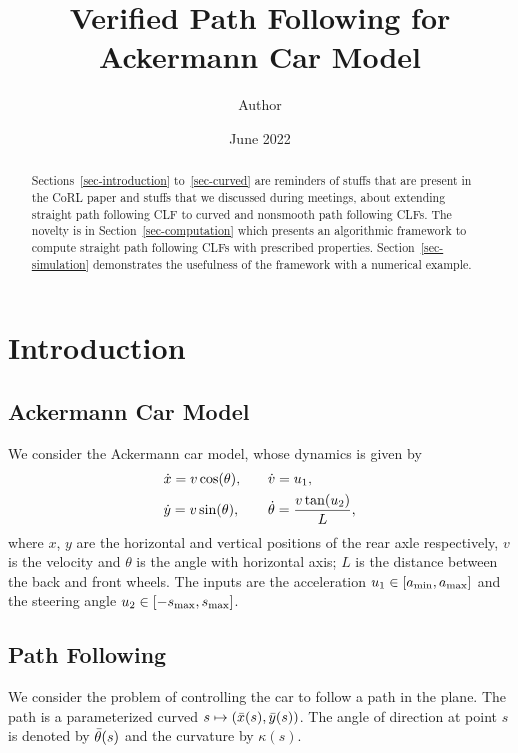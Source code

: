 \documentclass{article}
\title{Verified Path Following for Ackermann Car Model}
\author{Author}
\date{June 2022}
\theoremstyle{plain}
\theoremstyle{definition}
\theoremstyle{remark}
\newcommand{\smax}{s_\maxtxt}
\begin{document}
\maketitle

\begin{abstract}
Sections~\ref{sec-introduction} to~\ref{sec-curved} are reminders of stuffs
that are present in the CoRL paper and stuffs that we discussed during meetings,
about extending straight path following CLF to curved and nonsmooth path following CLFs.
The novelty is in Section~\ref{sec-computation} which presents an algorithmic framework to compute
straight path following CLFs with prescribed properties.
Section~\ref{sec-simulation} demonstrates the usefulness of the framework with a numerical example.
\end{abstract}

\section{Introduction}\label{sec-introduction}

\subsection{Ackermann Car Model}

We consider the Ackermann car model, whose dynamics is given by
\begin{equation}\label{eq-ackermann}
\begin{array}{>{\displaystyle}l@{\qquad}>{\displaystyle}l}
\dot{x} = v\cos(\theta), & \dot{v} = u_1, \\[4pt]
\dot{y} = v\sin(\theta), & \dot\theta = \frac{v\tan(u_2)}L,
\end{array}
\end{equation}
where $x$, $y$ are the horizontal and vertical positions of the rear axle respectively,
$v$ is the velocity and $\theta$ is the angle with horizontal axis;
$L$ is the distance between the back and front wheels.
The inputs are the acceleration $u_1\in[a_{\mathrm{min}},a_{\mathrm{max}}]$ and the steering angle $u_2\in[-\smax,\smax]$.

\subsection{Path Following}

We consider the problem of controlling the car to follow a path in the plane.
The path is a parameterized curved $s\mapsto(\bar{x}(s),\bar{y}(s))$.
The angle of direction at point $s$ is denoted by $\bar{\theta}(s)$
and the curvature by $\kappa(s)$.
\end{document}
